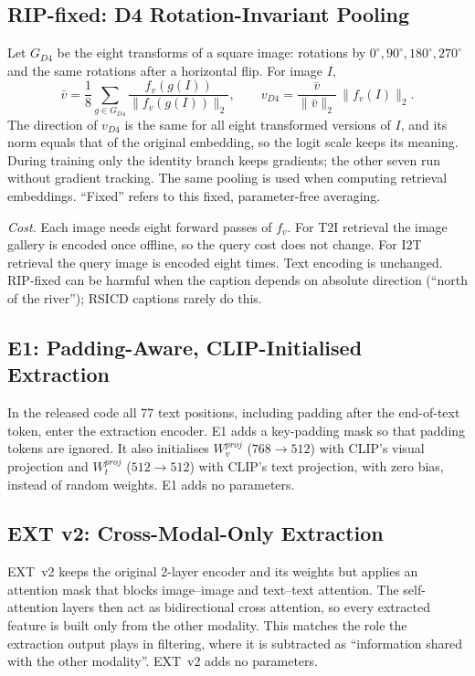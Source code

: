 \documentclass[conference]{IEEEtran}
\begin{document}
\subsection{RIP-fixed: D4 Rotation-Invariant Pooling}
\label{sec:rip}
Let $G_{D4}$ be the eight transforms of a square image: rotations by $0^\circ, 90^\circ, 180^\circ, 270^\circ$ and the same rotations after a horizontal flip. For image $I$,
\begin{equation}
\bar v = \frac{1}{8}\sum_{g\in G_{D4}} \frac{f_v(g(I))}{\lVert f_v(g(I))\rVert_2},\qquad
v_{D4} = \frac{\bar v}{\lVert \bar v\rVert_2}\,\lVert f_v(I)\rVert_2 .
\label{eq:rip}
\end{equation}
The direction of $v_{D4}$ is the same for all eight transformed versions of $I$, and its norm equals that of the original embedding, so the logit scale keeps its meaning. During training only the identity branch keeps gradients; the other seven run without gradient tracking. The same pooling is used when computing retrieval embeddings. ``Fixed'' refers to this fixed, parameter-free averaging.

\emph{Cost.} Each image needs eight forward passes of $f_v$. For T2I retrieval the image gallery is encoded once offline, so the query cost does not change. For I2T retrieval the query image is encoded eight times. Text encoding is unchanged. RIP-fixed can be harmful when the caption depends on absolute direction (``north of the river''); RSICD captions rarely do this.

\subsection{E1: Padding-Aware, CLIP-Initialised Extraction}
\label{sec:e1}
In the released code all 77 text positions, including padding after the end-of-text token, enter the extraction encoder. E1 adds a key-padding mask so that padding tokens are ignored. It also initialises $W_v^{proj}$ ($768\to512$) with CLIP's visual projection and $W_t^{proj}$ ($512\to512$) with CLIP's text projection, with zero bias, instead of random weights. E1 adds no parameters.

\subsection{EXT v2: Cross-Modal-Only Extraction}
\label{sec:ext2}
EXT~v2 keeps the original 2-layer encoder and its weights but applies an attention mask that blocks image--image and text--text attention. The self-attention layers then act as bidirectional cross attention, so every extracted feature is built only from the other modality. This matches the role the extraction output plays in filtering, where it is subtracted as ``information shared with the other modality''. EXT~v2 adds no parameters.
\end{document}
